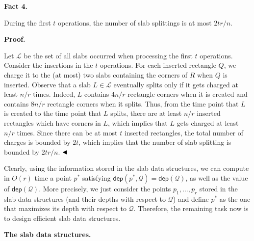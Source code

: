 \par
\par
\par\medskip\noindent\textbf{Fact 4.}\par
During the first $t$ operations, the number of slab splittings is at most $2tr/n$.
\par
\par
\par
\par\medskip\noindent\textbf{Proof.}\par
Let $\mathcal{L}$ be the set of all slabs occurred when processing the first $t$ operations. Consider the insertions in the $t$ operations. For each inserted rectangle $Q$, we charge it to the (at most) two slabs containing the corners of $R$ when $Q$ is inserted. Observe that a slab $L\in\mathcal{L}$ eventually splits only if it gets charged at least $n/r$ times. Indeed, $L$ contains $4n/r$ rectangle corners when it is created and contains $8n/r$ rectangle corners when it splits. Thus, from the time point that $L$ is created to the time point that $L$ splits, there are at least $n/r$ inserted rectangles which have corners in $L$, which implies that $L$ gets charged at least $n/r$ times. Since there can be at most $t$ inserted rectangles, the total number of charges is bounded by $2t$, which implies that the number of slab splitting is bounded by $2tr/n$. $\hfill\blacktriangleleft$
\par
\par
Clearly, using the information stored in the slab data structures, we can compute in $O(r)$ time a point $p^{*}$ satisfying $\mathsf{dep}(p^{*},\mathcal{Q})=\mathsf{dep}(\mathcal{Q})$, as well as the value of $\mathsf{dep}(\mathcal{Q})$. More precisely, we just consider the points $p_{1},\dots,p_{r}$ stored in the slab data structures (and their depths with respect to $\mathcal{Q}$) and define $p^{*}$ as the one that maximizes its depth with respect to $\mathcal{Q}$. Therefore, the remaining task now is to design efficient slab data structures.
\par
\par
\par\medskip\noindent\textbf{The slab data structures.}\par
